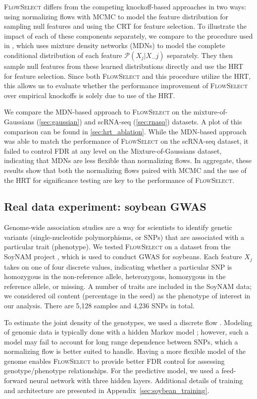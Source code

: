\documentclass{article}
\newcommand{\FlowSelect}{\textsc{FlowSelect}\xspace}
\begin{document}
\textsc{FlowSelect} differs from the competing knockoff-based approaches in two ways: using normalizing flows with MCMC to model the feature distribution for sampling null features and using the CRT for feature selection.
To illustrate the impact of each of these components separately,
we compare to the procedure used in \citet{tanseyHoldoutRandomizationTest2019}, which uses mixture density networks (MDNs) to model the complete conditional distribution of each feature $\mathcal P (X_j | X_-j)$ separately.
They then sample null features from these learned distributions directly and use the HRT for feature selection.
Since both \FlowSelect and this procedure utilize the HRT,
this allows us to evaluate whether the performance improvement of \FlowSelect over empirical knockoffs is solely due to use of the HRT.

We compare the MDN-based approach to \FlowSelect on the mixture-of-Gaussians (\cref{sec:gaussian}) and scRNA-seq (\cref{sec:rnasq}) datasets.
A plot of this comparison can be found in \cref{sec:hrt_ablation}.
While the MDN-based approach was able to match the performance of \FlowSelect on the scRNA-seq dataset, it failed to control FDR at any level on the Mixture-of-Gaussians dataset, indicating that MDNs are less flexible than normalizing flows.
In aggregate, these results show that both the normalizing flows paired with MCMC and the use of the HRT for significance testing are key to the performance of \textsc{FlowSelect}.


\subsection{Real data experiment: soybean GWAS}

\label{sec:soybean}
Genome-wide association studies are a way for scientists to identify genetic variants (single-nucleotide polymorphisms, or SNPs) that are associated with a particular trait (phenotype).
We tested \FlowSelect on a dataset from the SoyNAM project \citep{song2017soynam}, which is used to conduct GWAS for soybeans.
Each feature $X_{j}$ takes on one of four discrete values, indicating whether a particular SNP is homozygous in the non-reference allele, heterozygous, homozygous in the reference allele, or missing.
A number of traits are included in the SoyNAM data; we considered oil content (percentage in the seed) as the phenotype of interest in our analysis.
There are 5,128 samples and 4,236 SNPs in total.

To estimate the joint density of the genotypes, we used a discrete flow \citep{tranDiscreteFlowsInvertible2019}.
Modeling of genomic data is typically done with a hidden Markov model \citep{Xavier2016}; however, such a model may fail to account for long range dependence between SNPs, which a normalizing flow is better suited to handle.
Having a more flexible model of the genome enables \FlowSelect to provide better FDR control for assessing genotype/phenotype relationships.
For the predictive model, we used a feed-forward neural network with three hidden layers.
Additional details of training and architecture are presented in Appendix~\ref{sec:soybean_training}.
\end{document}
